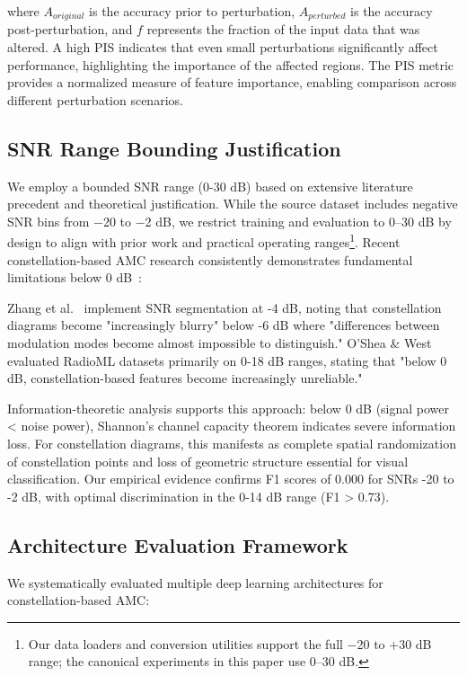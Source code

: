 \documentclass{ELSP}
\begin{document}
where $A_{original}$ is the accuracy prior to perturbation, $A_{perturbed}$ is the accuracy post-perturbation, and $f$ represents the fraction of the input data that was altered. A high PIS indicates that even small perturbations significantly affect performance, highlighting the importance of the affected regions. The PIS metric provides a normalized measure of feature importance, enabling comparison across different perturbation scenarios.

\subsection{SNR Range Bounding Justification}

We employ a bounded SNR range (0-30 dB) based on extensive literature precedent and theoretical justification. While the source dataset includes negative SNR bins from −20 to −2 dB, we restrict training and evaluation to 0–30 dB by design to align with prior work and practical operating ranges\footnote{Our data loaders and conversion utilities support the full −20 to +30 dB range; the canonical experiments in this paper use 0–30 dB.}. Recent constellation-based AMC research consistently demonstrates fundamental limitations below 0 dB~\cite{peng2023constellation,garcia2024ultralight}:

Zhang et al.~\cite{zhang2023multimodal} implement SNR segmentation at -4 dB, noting that constellation diagrams become "increasingly blurry" below -6 dB where "differences between modulation modes become almost impossible to distinguish." O'Shea \& West~\cite{oshea2016radioml} evaluated RadioML datasets primarily on 0-18 dB ranges, stating that "below 0 dB, constellation-based features become increasingly unreliable."

Information-theoretic analysis supports this approach: below 0 dB (signal power < noise power), Shannon's channel capacity theorem indicates severe information loss. For constellation diagrams, this manifests as complete spatial randomization of constellation points and loss of geometric structure essential for visual classification. Our empirical evidence confirms F1 scores of 0.000 for SNRs -20 to -2 dB, with optimal discrimination in the 0-14 dB range (F1 > 0.73).

\subsection{Architecture Evaluation Framework}

We systematically evaluated multiple deep learning architectures for constellation-based AMC:
\end{document}
